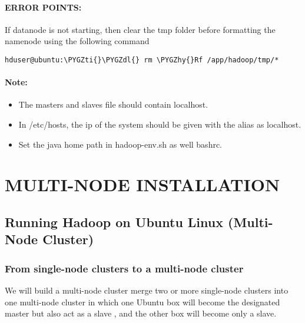 \documentclass[letterpaper,10pt,english]{sphinxmanual}
\def\PYGZdl{\char`\$}
\def\PYGZhy{\char`\-}
\def\PYGZti{\char`\~}
\begin{document}
\paragraph{ERROR POINTS:}
\label{hadoop:error-points}
If datanode is not starting, then clear the tmp folder before formatting the namenode using the following command

\begin{Verbatim}[commandchars=\\\{\}]
hduser@ubuntu:\PYGZti{}\PYGZdl{} rm \PYGZhy{}Rf /app/hadoop/tmp/*
\end{Verbatim}


\paragraph{Note:}
\label{hadoop:id4}\begin{itemize}
\item {} 
The masters and slaves file should contain localhost.

\item {} 
In /etc/hosts, the ip of the system should be given with the alias as localhost.

\item {} 
Set the java home path in hadoop-env.sh as well bashrc.

\end{itemize}


\section{MULTI-NODE INSTALLATION}
\label{hadoop:multi-node-installation}

\subsection{Running Hadoop on Ubuntu Linux (Multi-Node Cluster)}
\label{hadoop:running-hadoop-on-ubuntu-linux-multi-node-cluster}

\subsubsection{From single-node clusters to a multi-node cluster}
\label{hadoop:from-single-node-clusters-to-a-multi-node-cluster}
We will build a multi-node cluster merge two or more single-node clusters into one multi-node cluster in which one Ubuntu box will become the designated master but also act as a slave , and the other box will become only a slave.
\end{document}
